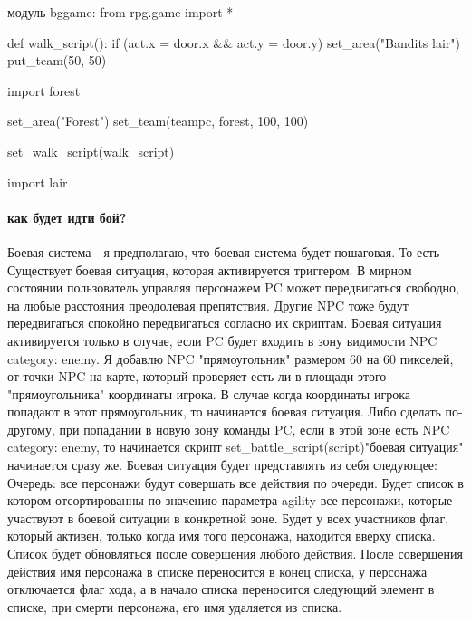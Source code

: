 модуль bggame:
from rpg.game import *

def walk\_script():
	if (act.x = door.x \&\& act.y = door.y)
		set\_area("Bandits lair")
		put\_team(50, 50)

import forest

set\_area("Forest")
set\_team(teampc, forest, 100, 100)


set\_walk\_script(walk\_script)

import lair


\paragraph{как будет идти бой?}
Боевая система - я предполагаю, что боевая система будет пошаговая. То есть Существует боевая ситуация, которая активируется триггером. В мирном состоянии пользователь управляя персонажем PC может передвигаться свободно, на любые расстояния преодолевая препятствия. Другие NPC тоже будут передвигаться спокойно передвигаться согласно их скриптам. Боевая ситуация активируется только в случае, если PC будет входить в зону видимости NPC category: enemy. Я добавлю NPC "прямоугольник" размером 60 на 60 пикселей, от точки NPC на карте, который проверяет есть ли в площади этого "прямоугольника" координаты игрока. В случае когда координаты игрока попадают в этот прямоугольник, то начинается боевая ситуация. Либо сделать по-другому, при попадании в новую зону команды PC, если в этой зоне есть NPC category: enemy, то начинается скрипт set\_battle\_script(script)"боевая ситуация" начинается сразу же. Боевая ситуация будет представлять из себя следующее:
Очередь: все персонажи будут совершать все действия по очереди. Будет список в котором отсортированны по значению параметра agility все персонажи, которые участвуют в боевой ситуации в конкретной зоне. Будет у всех участников флаг, который активен, только когда имя того персонажа, находится вверху списка. Список будет обновляться после совершения любого действия. После совершения действия имя персонажа в списке переносится в конец списка, у персонажа отключается флаг хода, а в начало списка переносится следующий элемент в списке, при смерти персонажа, его имя удаляется из списка.

